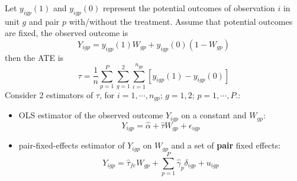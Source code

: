 \documentclass[twoside]{article}
\begin{document}
Let $y_{igp}(1)$ and $y_{igp}(0)$ represent the potential outcomes of observation $i$ in unit $g$ and pair $p$ with/without the treatment. Assume that potential outcomes are fixed, the observed outcome is 
$$
Y_{igp}=y_{igp}(1)W_{gp} + y_{igp}(0)(1-W_{gp})
$$
then the ATE is 
\begin{equation*}
    \tau = \frac{1}{n}\sum^P_{p=1}\sum^2_{g=1}\sum^{n_{gp}}_{i=1}\left[y_{igp}(1)-y_{igp}(0)\right]
\end{equation*}
Consider 2 estimators of $\tau$, for $i=1,\cdots,n_{gp}$; $g=1,2$; $p=1,\cdots,P$.:
\begin{itemize}
    \item OLS estimator of the observed outcome $Y_{igp}$ on a constant and $W_{gp}$:
    \begin{equation}\label{eq:cr_olsest}
        Y_{igp} = \hat{\alpha}+\hat{\tau}W_{gp}+\epsilon_{igp}
    \end{equation}
    \item pair-fixed-effects estimator of $Y_{igp}$ on $W_{gp}$ and a set of \textbf{pair} fixed effects:
    \begin{equation}\label{eq:cr_feest}
        Y_{igp}= \hat{\tau}_{fe} W_{gp} + \sum^P_{p=1}\hat{\gamma}_p \delta_{igp} + u_{igp}
    \end{equation}
\end{itemize}
\end{document}
